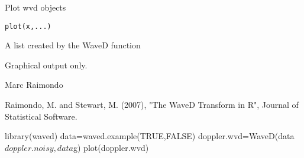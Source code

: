 \begin{Description}\relax
Plot  wvd objects
\end{Description}
\begin{Usage}
\begin{verbatim}
plot(x,...) 
\end{verbatim}
\end{Usage}
\begin{Arguments}
\begin{ldescription}
\item[\code{x}] A list created by the WaveD function 
\end{ldescription}
\end{Arguments}
\begin{Value}
Graphical output only.
\end{Value}
\begin{Author}\relax
Marc Raimondo
\end{Author}
\begin{References}\relax
Raimondo, M. and Stewart, M. (2007),
"The WaveD Transform in R", Journal of Statistical Software.
\end{References}
\begin{SeeAlso}\relax
{}
\end{SeeAlso}
\begin{Examples}
\begin{ExampleCode}
library(waved)
data=waved.example(TRUE,FALSE)
doppler.wvd=WaveD(data$doppler.noisy,data$g)
plot(doppler.wvd)

\end{ExampleCode}
\end{Examples}

